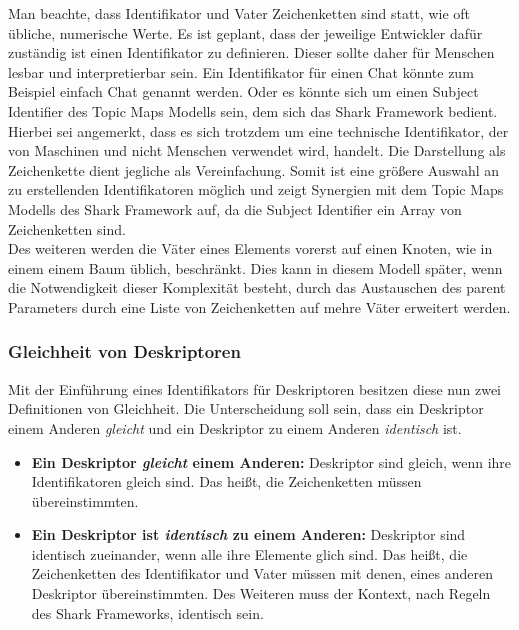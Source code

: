\documentclass[a4paper]{article}
\begin{document}
	Man beachte, dass Identifikator und Vater Zeichenketten sind statt, wie
	oft übliche, numerische Werte. Es ist geplant, dass der jeweilige Entwickler
	dafür zuständig ist einen Identifikator zu definieren. Dieser sollte daher
	für Menschen lesbar und interpretierbar sein. Ein Identifikator für einen
	Chat könnte zum Beispiel einfach Chat genannt werden. Oder es könnte sich um
	einen Subject Identifier des Topic Maps Modells sein, dem sich das Shark
	Framework bedient. \\
	
	Hierbei sei angemerkt, dass es sich trotzdem um eine technische Identifikator,
	der von Maschinen und nicht Menschen verwendet wird, handelt. Die Darstellung
	als Zeichenkette dient jegliche als Vereinfachung. Somit ist eine größere
	Auswahl an zu erstellenden Identifikatoren möglich und zeigt Synergien 
	mit dem Topic Maps Modells des Shark Framework auf, da die Subject Identifier
	ein Array von Zeichenketten sind. \\
	
	Des weiteren werden die Väter eines Elements vorerst auf einen Knoten,
	wie in einem einem Baum üblich, beschränkt. Dies kann in diesem Modell später,
	wenn die Notwendigkeit dieser Komplexität besteht, durch das Austauschen des
	parent Parameters durch eine Liste von Zeichenketten auf mehre Väter erweitert
	werden.
	
	\subsubsection{Gleichheit von Deskriptoren}
	
	Mit der Einführung eines Identifikators für Deskriptoren besitzen
	diese nun zwei Definitionen von Gleichheit. Die Unterscheidung soll sein,
	dass ein Deskriptor einem Anderen \emph{gleicht} und ein Deskriptor zu
	einem Anderen \emph{identisch} ist.
	
	\begin{itemize}
		\item \textbf{Ein Deskriptor \emph{gleicht} einem Anderen:} Deskriptor
		sind gleich, wenn ihre Identifikatoren gleich sind. Das heißt, die
		Zeichenketten müssen übereinstimmten.
		\item \textbf{Ein Deskriptor ist \emph{identisch} zu einem Anderen:}
		Deskriptor sind identisch zueinander, wenn alle ihre Elemente glich sind.
		Das heißt, die Zeichenketten des Identifikator und Vater müssen mit denen,
		eines anderen Deskriptor übereinstimmten. Des Weiteren muss der Kontext,
		nach Regeln des Shark Frameworks, identisch sein.
	\end{itemize} 	
	
\end{document}
